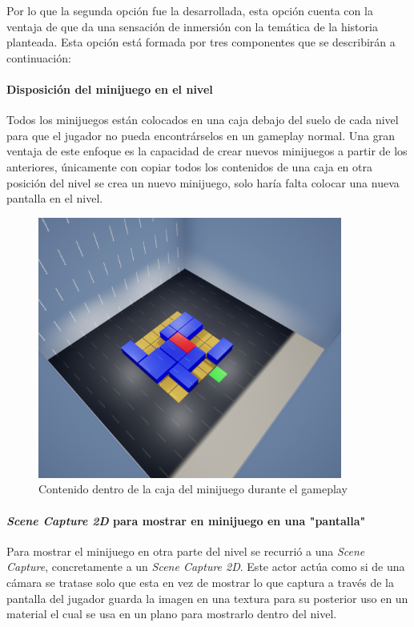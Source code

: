 Por lo que la segunda opción fue la desarrollada, esta opción cuenta con la ventaja de que da una sensación de inmersión con la temática de la historia planteada. Esta opción está formada por tres componentes que se describirán a continuación:

\paragraph{Disposición del minijuego en el nivel}

Todos los minijuegos están colocados en una caja debajo del suelo de cada nivel para que el jugador no pueda encontrárselos en un gameplay normal. Una gran ventaja de este enfoque es la capacidad de crear nuevos minijuegos a partir de los anteriores, únicamente con copiar todos los contenidos de una caja en otra posición del nivel se crea un nuevo minijuego, solo haría falta colocar una nueva pantalla en el nivel. \\

\begin{figure}[H]
  \centering
  \includegraphics[width=10cm]{./images/Minigame_Cube_When_Playing.png}
  \caption{Contenido dentro de la caja del minijuego durante el gameplay}
  \label{MinigameWhenPlaying}
\end{figure}

\paragraph{\textit{Scene Capture 2D} para mostrar en minijuego en una "pantalla"}
Para mostrar el minijuego en otra parte del nivel se recurrió a una \textit{Scene Capture}, concretamente a un \textit{Scene Capture 2D}. Este actor actúa como si de una cámara se tratase solo que esta en vez de mostrar lo que captura a través de la pantalla del jugador guarda la imagen en una textura para su posterior uso en un material el cual se usa en un plano para mostrarlo dentro del nivel.

